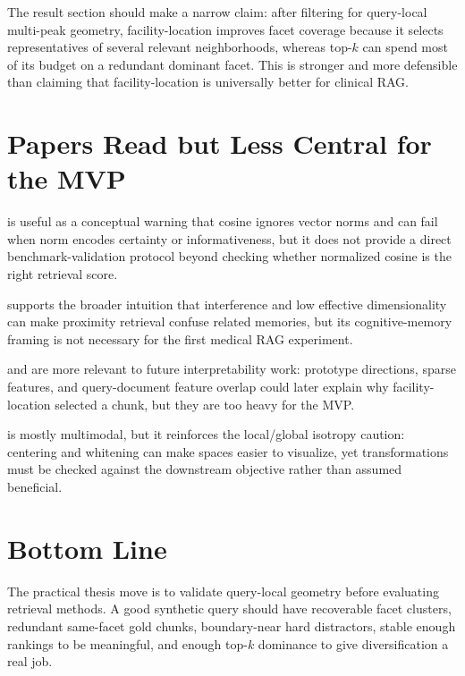 \documentclass[11pt,a4paper]{article}
\begin{document}
The result section should make a narrow claim: after filtering for query-local multi-peak geometry, facility-location improves facet coverage because it selects representatives of several relevant neighborhoods, whereas top-$k$ can spend most of its budget on a redundant dominant facet. This is stronger and more defensible than claiming that facility-location is universally better for clinical RAG.

\section{Papers Read but Less Central for the MVP}

\citet{youSemanticsAngleWhen2025} is useful as a conceptual warning that cosine ignores vector norms and can fail when norm encodes certainty or informativeness, but it does not provide a direct benchmark-validation protocol beyond checking whether normalized cosine is the right retrieval score.

\citet{barmanGeometryForgetting2026} supports the broader intuition that interference and low effective dimensionality can make proximity retrieval confuse related memories, but its cognitive-memory framing is not necessary for the first medical RAG experiment.

\citet{tehenanSemanticGeometrySentence2025} and \citet{caiXetrievalMechanisticallyExplaining2026} are more relevant to future interpretability work: prototype directions, sparse features, and query-document feature overlap could later explain why facility-location selected a chunk, but they are too heavy for the MVP.

\citet{tyshchukIsotropyMultimodalEmbeddings2023} is mostly multimodal, but it reinforces the local/global isotropy caution: centering and whitening can make spaces easier to visualize, yet transformations must be checked against the downstream objective rather than assumed beneficial.

\section{Bottom Line}

The practical thesis move is to validate query-local geometry before evaluating retrieval methods. A good synthetic query should have recoverable facet clusters, redundant same-facet gold chunks, boundary-near hard distractors, stable enough rankings to be meaningful, and enough top-$k$ dominance to give diversification a real job.


\end{document}
